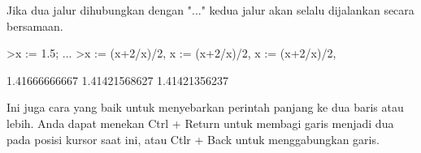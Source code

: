\documentclass[12pt,Times new roman,letterpaper]{book}
\begin{document}
\begin{eulernootebook}
\begin{eulercomment}
\begin{eulercomment}
\begin{eulernootebook}
\begin{eulercomment}
Jika dua jalur dihubungkan dengan "..." kedua jalur akan selalu
dijalankan secara bersamaan.
\end{eulercomment}
\begin{eulerprompt}
>x := 1.5; ...
>x := (x+2/x)/2, x := (x+2/x)/2, x := (x+2/x)/2, 
\end{eulerprompt}
\begin{euleroutput}
  1.41666666667
  1.41421568627
  1.41421356237
\end{euleroutput}
\begin{eulercomment}
Ini juga cara yang baik untuk menyebarkan perintah panjang ke dua
baris atau lebih. Anda dapat menekan Ctrl + Return untuk membagi garis
menjadi dua pada posisi kursor saat ini, atau Ctlr + Back untuk
menggabungkan garis.


\end{eulercomment}
\end{eulernootebook}
\end{eulercomment}
\end{eulercomment}
\end{eulernootebook}
\end{document}
